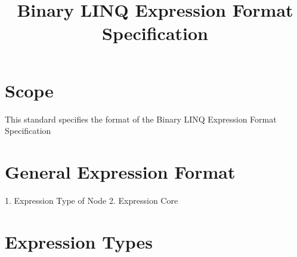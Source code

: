\documentclass[makeidx]{article}
\title{Binary LINQ Expression Format Specification}
\author{}
\begin{document}
\maketitle
\tableofcontents

\newpage


\section{Scope}
This standard specifies the format of the Binary LINQ Expression Format Specification

\section{General Expression Format}

1. Expression Type of Node
2. Expression Core

\section{Expression Types}
\end{document}
